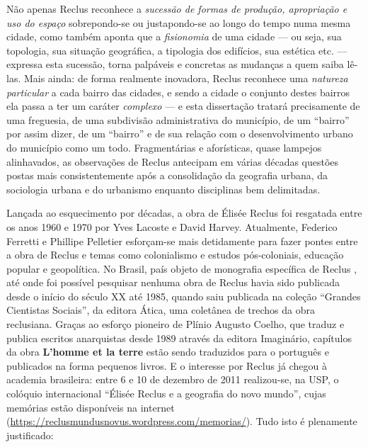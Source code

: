 Não apenas Reclus reconhece a \textit{sucessão de formas de produção, apropriação e uso do espaço} sobrepondo-se ou justapondo-se ao longo do tempo numa mesma cidade, como também aponta que a \textit{fisionomia} de uma cidade --- ou seja, sua topologia, sua situação geográfica, a tipologia dos edifícios, sua estética etc. --- expressa esta sucessão, torna palpáveis e concretas as mudanças a quem saiba lê-las. Mais ainda: de forma realmente inovadora, Reclus reconhece uma \textit{natureza particular} a cada bairro das cidades, e sendo a cidade o conjunto destes bairros ela passa a ter um caráter \textit{complexo} --- e esta dissertação tratará precisamente de uma freguesia, de uma subdivisão administrativa do município, de um ``bairro'' por assim dizer, de um ``bairro'' e de sua relação com o desenvolvimento urbano do município como um todo. Fragmentárias e aforísticas, quase lampejos alinhavados, as observações de Reclus antecipam em várias décadas questões postas mais consistentemente após a consolidação da geografia urbana, da sociologia urbana e do urbanismo enquanto disciplinas bem delimitadas.

Lançada ao esquecimento por décadas, a obra de Élisée Reclus foi resgatada entre os anos 1960 e 1970 por Yves Lacoste e David Harvey. Atualmente, Federico Ferretti e Phillipe Pelletier esforçam-se mais detidamente para fazer pontes entre a obra de Reclus e temas como colonialismo e estudos pós-coloniais, educação popular e geopolítica. No Brasil, país objeto de monografia específica de Reclus \cite{RECLUS1900}, até onde foi possível pesquisar nenhuma obra de Reclus havia sido publicada desde o início do século XX até 1985, quando saiu publicada na coleção ``Grandes Cientistas Sociais'', da editora Ática, uma coletânea de trechos da obra reclusiana. Graças ao esforço pioneiro de Plínio Augusto Coelho, que traduz e publica escritos anarquistas desde 1989 através da editora Imaginário, capítulos da obra \textbf{L'homme et la terre} estão sendo traduzidos para o português e publicados na forma pequenos livros. E o interesse por Reclus já chegou à academia brasileira: entre 6 e 10 de dezembro de 2011 realizou-se, na USP, o colóquio internacional ``Élisée Reclus e a geografia do novo mundo'', cujas memórias estão disponíveis na internet (\url{https://reclusmundusnovus.wordpress.com/memorias/}). Tudo isto é plenamente justificado:

